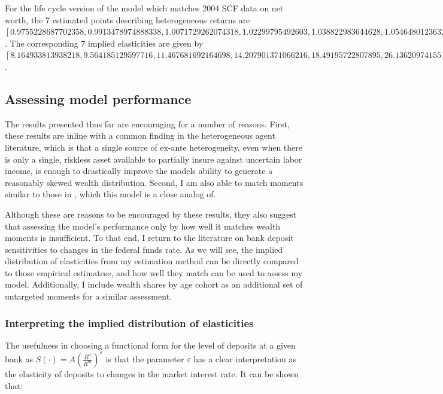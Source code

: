 \par For the life cycle version of the model which matches 2004 SCF data on net worth, the 7 estimated points describing heterogeneous returns are $[0.9755228687702358, 0.9913478974888338, 1.0071729262074318, 1.02299795492603, 1.038822983644628, 1.054648012363226, 1.0704730410818242]$. The corresponding 7 implied elasticities are given by $[8.164933813938218, 9.564185129597716, 11.467681692164698, 14.207901371066216, 18.49195722807895, 26.136209741551728, 43.6447520727303]$.

\subsection{Assessing model performance}

\par The results presented thus far are encouraging for a number of reasons. First, these results are inline with a common finding in the heterogeneous agent literature, which is that a single source of ex-ante heterogeneity, even when there is only a single, riskless asset available to partially insure against uncertain labor income, is enough to drastically improve the models ability to generate a reasonably skewed wealth distribution. Second, I am also able to match moments similar to those in \cite{cstw2017}, which this model is a close analog of.

\par Although these are reasons to be encouraged by these results, they also suggest that assessing the model's performance only by how well it matches wealth moments is insufficient. To that end, I return to the literature on bank deposit sensitivities to changes in the federal funds rate. As we will see, the implied distribution of elasticities from my estimation method can be directly compared to those empirical estimatese, and how well they match can be used to assess my model. Additionally, I include wealth shares by age cohort as an additional set of untargeted moments for a similar assessment.  

\subsubsection{Interpreting the implied distribution of elasticities}

\par The usefulness in choosing a functional form for the level of deposits at a given bank as $S(\cdot) = A \left( \frac{R^d}{R^m} \right)^{\varepsilon}$ is that the parameter $\varepsilon$ has a clear interpretation as the elasticity of deposits to changes in the market interest rate. It can be shown that:

